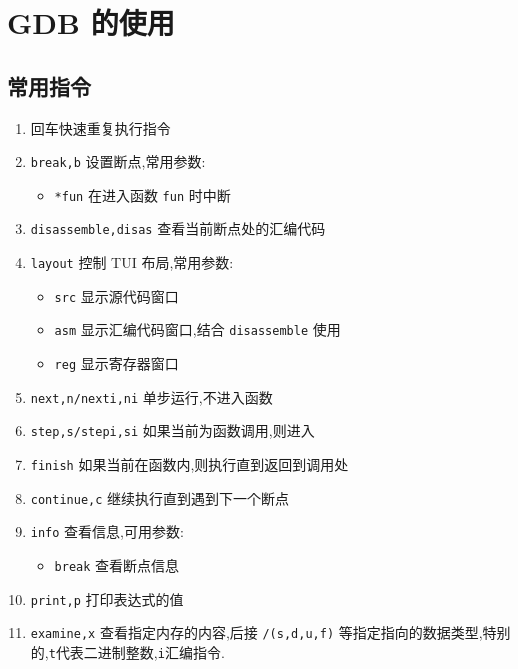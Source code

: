 
\usepackage{../../lectures_preamble}


    \section{GDB 的使用}
    \subsection{常用指令}
    \begin{enumerate}
        \item 回车快速重复执行指令
        \item \texttt{break,b} 设置断点,常用参数:
            \begin{itemize}
                \item \texttt{*fun} 在进入函数 \texttt{fun} 时中断
            \end{itemize}
        \item \texttt{disassemble,disas} 查看当前断点处的汇编代码
        \item \texttt{layout} 控制 TUI 布局,常用参数:
            \begin{itemize}
                \item \texttt{src} 显示源代码窗口
                \item \texttt{asm} 显示汇编代码窗口,结合 \texttt{disassemble} 使用
                \item \texttt{reg} 显示寄存器窗口
            \end{itemize}
        \item \texttt{next,n/nexti,ni} 单步运行,不进入函数
        \item \texttt{step,s/stepi,si} 如果当前为函数调用,则进入
        \item \texttt{finish} 如果当前在函数内,则执行直到返回到调用处
        \item \texttt{continue,c} 继续执行直到遇到下一个断点
        \item \texttt{info} 查看信息,可用参数:
            \begin{itemize}
                \item \texttt{break} 查看断点信息
            \end{itemize}
        \item \texttt{print,p} 打印表达式的值
        \item \texttt{examine,x} 查看指定内存的内容,后接 \texttt{/(s,d,u,f)} 等指定指向的数据类型,特别的,\texttt{t}代表二进制整数,\texttt{i}汇编指令.

\end{enumerate}
